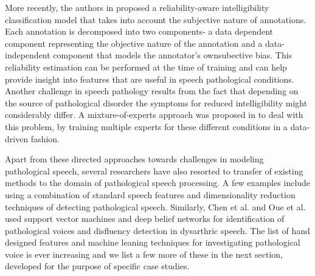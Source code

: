 \documentclass{article}
\begin{document}
More recently, the authors in \cite{kumar2015maxentrel} proposed a reliability-aware intelligibility classification model that takes into account the subjective nature of annotations. Each annotation is decomposed into two components- a data dependent component representing the objective nature of the annotation and a data-independent component that models the annotator's ownsubective bias. This reliability estimation can be performed at the time of training and can help provide insight into features that are useful in speech pathological conditions.
Another challenge in speech pathology results from the fact that depending on the source of pathological disorder the symptoms for reduced intelligibility might considerably differ. A mixture-of-experts approach was proposed in \cite{gupta2014pathology} to deal with this problem, by training multiple experts for these different conditions in a data-driven fashion.

Apart from these directed approaches towards challenges in modeling pathological speech, several researchers have also resorted to transfer of existing methods to the domain of pathological speech processing.
A few examples \cite{godino2006dimensionality,umapathy2005feature} include using a combination of standard speech features and dimensionality reduction techniques of detecting pathological speech.
Similarly, Chen et al. \cite{chen2007svm} and Oue et al. \cite{oueautomatic} used support vector machines and deep belief networks for identification of pathological voices and disfluency detection in dysarthric speech.
The list of hand designed features and machine leaning techniques for investigating pathological voice is ever increasing and we list a few more of these in the next section, developed for the purpose of specific case studies.
\end{document}
